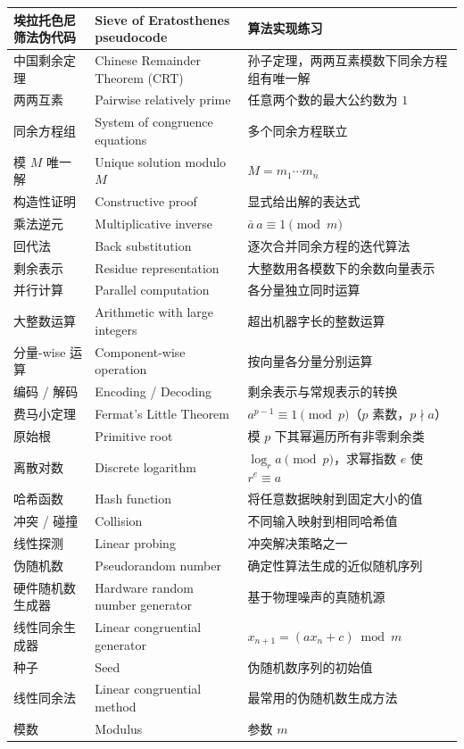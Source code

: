 \documentclass[UTF8,11pt,a4paper]{ctexbook}   %
\theoremstyle{definition}
\begin{document}
\begin{longtable}{|p{4.8cm}|p{4.8cm}|p{4.8cm}|}
埃拉托色尼筛法伪代码 & Sieve of Eratosthenes pseudocode & 算法实现练习 \\
\hline
中国剩余定理 & Chinese Remainder Theorem (CRT) & 孙子定理，两两互素模数下同余方程组有唯一解 \\
两两互素 & Pairwise relatively prime & 任意两个数的最大公约数为 $1$ \\
同余方程组 & System of congruence equations & 多个同余方程联立 \\
模 $M$ 唯一解 & Unique solution modulo $M$ & $M=m_1\cdots m_n$ \\
构造性证明 & Constructive proof & 显式给出解的表达式 \\
乘法逆元 & Multiplicative inverse & $\bar{a}\,a \equiv 1 \pmod{m}$ \\
回代法 & Back substitution & 逐次合并同余方程的迭代算法 \\
剩余表示 & Residue representation & 大整数用各模数下的余数向量表示 \\
并行计算 & Parallel computation & 各分量独立同时运算 \\
大整数运算 & Arithmetic with large integers & 超出机器字长的整数运算 \\
分量-wise 运算 & Component-wise operation & 按向量各分量分别运算 \\
编码 / 解码 & Encoding / Decoding & 剩余表示与常规表示的转换 \\
\hline
费马小定理 & Fermat's Little Theorem & $a^{p-1}\equiv 1\pmod p$（$p$ 素数，$p\nmid a$） \\
原始根 & Primitive root & 模 $p$ 下其幂遍历所有非零剩余类 \\
离散对数 & Discrete logarithm & $\log_r a\pmod p$，求幂指数 $e$ 使 $r^e\equiv a$ \\
哈希函数 & Hash function & 将任意数据映射到固定大小的值 \\
冲突 / 碰撞 & Collision & 不同输入映射到相同哈希值 \\
线性探测 & Linear probing & 冲突解决策略之一 \\
伪随机数 & Pseudorandom number & 确定性算法生成的近似随机序列 \\
硬件随机数生成器 & Hardware random number generator & 基于物理噪声的真随机源 \\
线性同余生成器 & Linear congruential generator & $x_{n+1}=(ax_n+c)\bmod m$ \\
种子 & Seed & 伪随机数序列的初始值 \\
\hline
线性同余法 & Linear congruential method & 最常用的伪随机数生成方法 \\
模数 & Modulus & 参数 $m$ \\

\end{longtable}
\end{document}
